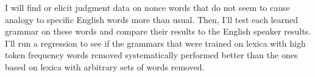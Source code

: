 I will find or elicit judgment data on nonce words that do not seem to cause analogy to
specific English words more than usual. Then, I'll test each learned grammar on these words
and compare their results to the English speaker results. I'll run a regression to see if
the grammars that were trained on lexica with high token frequency words removed systematically
performed better than the ones based on lexica with arbitrary sets of words removed.







